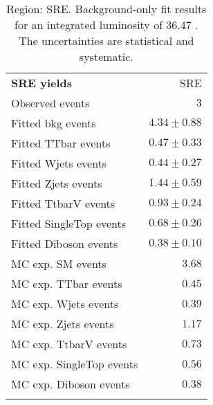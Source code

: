 

\begin{table}
\begin{center}
\setlength{\tabcolsep}{0.0pc}
{\small
\begin{tabular*}{\textwidth}{@{\extracolsep{\fill}}lr}
\noalign{\smallskip}\hline\noalign{\smallskip}
{\bf SRE yields}           & SRE              \\[-0.05cm]
\noalign{\smallskip}\hline\noalign{\smallskip}
Observed events          & $3$                    \\
\noalign{\smallskip}\hline\noalign{\smallskip}
Fitted bkg events         & $4.34 \pm 0.88$              \\
\noalign{\smallskip}\hline\noalign{\smallskip}
        Fitted TTbar events         & $0.47 \pm 0.33$              \\
        Fitted Wjets events         & $0.44 \pm 0.27$              \\
        Fitted Zjets events         & $1.44 \pm 0.59$              \\
        Fitted TtbarV events         & $0.93 \pm 0.24$              \\
        Fitted SingleTop events         & $0.68 \pm 0.26$              \\
        Fitted Diboson events         & $0.38 \pm 0.10$              \\
 \noalign{\smallskip}\hline\noalign{\smallskip}
MC exp. SM events              & $3.68$              \\
\noalign{\smallskip}\hline\noalign{\smallskip}
        MC exp. TTbar events         & $0.45$              \\
        MC exp. Wjets events         & $0.39$              \\
        MC exp. Zjets events         & $1.17$              \\
        MC exp. TtbarV events         & $0.73$              \\
        MC exp. SingleTop events         & $0.56$              \\
        MC exp. Diboson events         & $0.38$              \\
\noalign{\smallskip}\hline\noalign{\smallskip}
\end{tabular*}
}
\end{center}
\caption{Region: SRE. Background-only fit results for an integrated luminosity of 36.47 \ifb. The uncertainties are statistical and systematic.
}
\label{table.bkgonly.SRE}
\end{table}
%